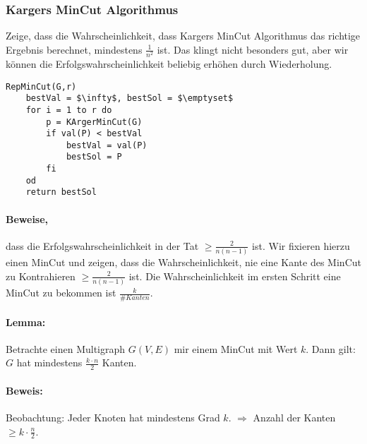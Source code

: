 \subsubsection{Kargers MinCut Algorithmus}
Zeige, dass die Wahrscheinlichkeit, dass Kargers MinCut Algorithmus das richtige Ergebnis berechnet, mindestens $\frac{1}{n^2}$ ist. Das klingt nicht besonders gut, aber wir können die Erfolgswahrscheinlichkeit beliebig erhöhen durch Wiederholung.

\begin{lstlisting}[mathescape]
RepMinCut(G,r)
	bestVal = $\infty$, bestSol = $\emptyset$
	for i = 1 to r do
		p = KArgerMinCut(G)
		if val(P) < bestVal
			bestVal = val(P)
			bestSol = P
		fi
	od
	return bestSol
\end{lstlisting}



\paragraph*{Beweise,} dass die Erfolgswahrscheinlichkeit in der Tat $\geq \frac{2}{n(n-1)}$ ist. Wir fixieren hierzu einen MinCut und zeigen, dass die Wahrscheinlichkeit, nie eine Kante des MinCut zu Kontrahieren $\geq \frac{2}{n(n-1)}$ ist.
Die Wahrscheinlichkeit im ersten Schritt eine MinCut zu bekommen ist $\frac{k}{\#Kanten}$.

\paragraph*{Lemma:} Betrachte einen Multigraph $G(V,E)$ mir einem MinCut mit Wert $k$. Dann gilt: $G$ hat mindestens $\frac{k \cdot n}{2}$ Kanten.
\paragraph*{Beweis:} Beobachtung: Jeder Knoten hat mindestens Grad $k$. $\Rightarrow$ Anzahl der Kanten $\geq k \cdot \frac{n}{2}$.

